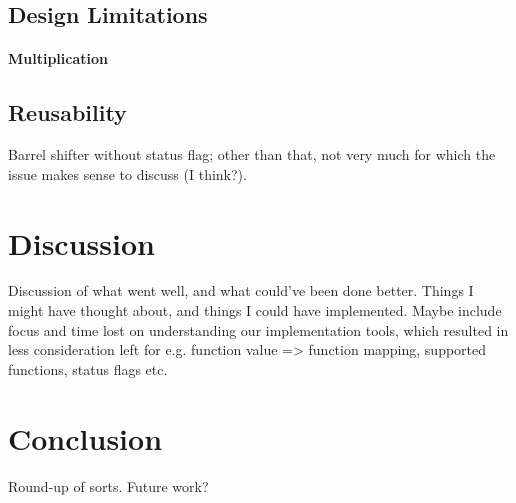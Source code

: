 \documentclass{article}
\begin{document}
\subsection{Design Limitations}
\label{subsec:limitations}
\paragraph{Multiplication}

\subsection{Reusability}
\label{subsec:reusability}
Barrel shifter without status flag; other than that, not very much for which the issue makes sense to discuss (I think?).

\section{Discussion}
\label{sec:discussion}
Discussion of what went well, and what could've been done better. Things I might have thought about, and things I could have implemented. Maybe include focus and time lost on understanding our implementation tools, which resulted in less consideration left for e.g. function value => function mapping, supported functions, status flags etc.

\section{Conclusion}
\label{sec:conclusion}
Round-up of sorts. Future work?
\end{document}

